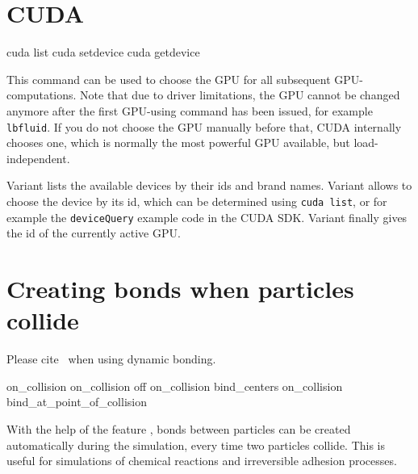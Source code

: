 \section{CUDA}
\label{sec:cuda}
\begin{essyntax}
   cuda list
   cuda setdevice 
   cuda getdevice
\end{essyntax}

This command can be used to choose the GPU for all subsequent
GPU-computations. Note that due to driver limitations, the GPU cannot
be changed anymore after the first GPU-using command has been issued,
for example \texttt{lbfluid}. If you do not choose the GPU manually
before that, CUDA internally chooses one, which is normally the most
powerful GPU available, but load-independent.

Variant  lists the available devices by their ids and brand
names. Variant  allows to choose the device by its id,
which can be determined using \texttt{cuda list}, or for example the
\texttt{deviceQuery} example code in the CUDA SDK. Variant 
finally gives the id of the currently active GPU.


\section{Creating bonds when particles collide}

\begin{citebox}
  Please cite~ when using dynamic bonding.
\end{citebox}


\begin{essyntax}
 on\_collision
 on\_collision off
 on\_collision  bind_centers  
 on\_collision  bind_at_point_of_collision    
\end{essyntax}

With the help of the feature , bonds
between particles can be created automatically during the simulation,
every time two particles collide. This is useful for simulations of
chemical reactions and irreversible adhesion processes.

